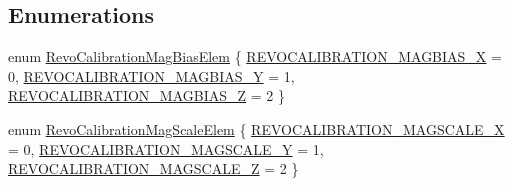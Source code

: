 \subsection*{\-Enumerations}
\begin{DoxyCompactItemize}
\item 
enum \hyperlink{group___revo_calibration_ga244c0407e32ad0219f4ac5974ace2451}{\-Revo\-Calibration\-Mag\-Bias\-Elem} \{ \hyperlink{group___revo_calibration_gga244c0407e32ad0219f4ac5974ace2451a7c14bfb0859ec04b49b4f280270b86b3}{\-R\-E\-V\-O\-C\-A\-L\-I\-B\-R\-A\-T\-I\-O\-N\-\_\-\-M\-A\-G\-B\-I\-A\-S\-\_\-\-X} = 0, 
\hyperlink{group___revo_calibration_gga244c0407e32ad0219f4ac5974ace2451a3330c3fbcac0178ad2d968d53d4ae6f0}{\-R\-E\-V\-O\-C\-A\-L\-I\-B\-R\-A\-T\-I\-O\-N\-\_\-\-M\-A\-G\-B\-I\-A\-S\-\_\-\-Y} = 1, 
\hyperlink{group___revo_calibration_gga244c0407e32ad0219f4ac5974ace2451a1e7b53e33425b3a4098552e26c6b5928}{\-R\-E\-V\-O\-C\-A\-L\-I\-B\-R\-A\-T\-I\-O\-N\-\_\-\-M\-A\-G\-B\-I\-A\-S\-\_\-\-Z} = 2
 \}
\item 
enum \hyperlink{group___revo_calibration_ga1cc9bf5f2f2daaf599fdae39fc82eb4a}{\-Revo\-Calibration\-Mag\-Scale\-Elem} \{ \hyperlink{group___revo_calibration_gga1cc9bf5f2f2daaf599fdae39fc82eb4aab13de0bcee65b97dad060dfa894ed933}{\-R\-E\-V\-O\-C\-A\-L\-I\-B\-R\-A\-T\-I\-O\-N\-\_\-\-M\-A\-G\-S\-C\-A\-L\-E\-\_\-\-X} = 0, 
\hyperlink{group___revo_calibration_gga1cc9bf5f2f2daaf599fdae39fc82eb4aa3e932a8b6f48d191fd0a1925770c43f3}{\-R\-E\-V\-O\-C\-A\-L\-I\-B\-R\-A\-T\-I\-O\-N\-\_\-\-M\-A\-G\-S\-C\-A\-L\-E\-\_\-\-Y} = 1, 
\hyperlink{group___revo_calibration_gga1cc9bf5f2f2daaf599fdae39fc82eb4aa27976e7a5f33d222a552578894bc03ec}{\-R\-E\-V\-O\-C\-A\-L\-I\-B\-R\-A\-T\-I\-O\-N\-\_\-\-M\-A\-G\-S\-C\-A\-L\-E\-\_\-\-Z} = 2
 \}
\end{DoxyCompactItemize}
